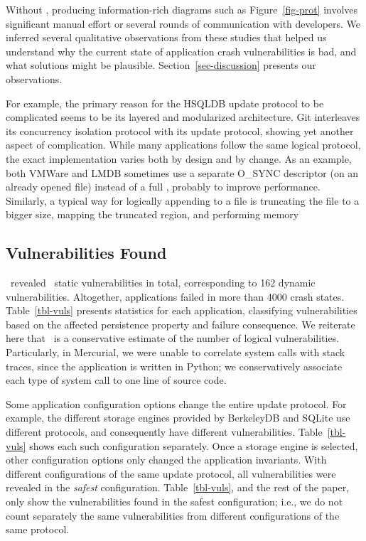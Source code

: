 Without \toolname, producing information-rich diagrams such as Figure~\ref{fig-prot}
involves significant manual effort or several rounds of communication with developers.
We inferred several qualitative observations from these studies that helped us 
understand why the current state of application crash vulnerabilities is bad, and
what solutions might be plausible. Section~\ref{sec-discussion} presents our observations.

For example, the primary reason for the HSQLDB
update protocol to be complicated seems to be its layered and modularized architecture.
Git interleaves its concurrency isolation protocol with its update protocol, showing
yet another aspect of complication. While many applications follow the same logical
protocol, the exact implementation varies both by design and by change. As an example,
both VMWare and LMDB sometimes use a separate O\_SYNC descriptor (on an already opened file)
instead of a full \fsyncSC, probably to improve performance. Similarly, a typical way
for logically appending to a file is truncating the file to a bigger size, mapping the truncated
region, and performing memory 
\fi

\subsection{Vulnerabilities Found}
\label{sec-vuls}


\toolname\ revealed \totbugs\ static vulnerabilities in total, corresponding to 162
dynamic vulnerabilities. Altogether, applications failed in more than 4000
crash states. Table~\ref{tbl-vuls} presents statistics for each application,
classifying vulnerabilities based on the affected persistence property and
failure consequence. We reiterate here that \totbugs\ is a conservative
estimate of the number of logical vulnerabilities. Particularly, in
Mercurial, we were unable to correlate system calls with stack traces, since
the application is written in Python; we conservatively associate each type of
system call to one line of source code.

Some application configuration options change the entire update protocol. For
example, the different storage engines provided by BerkeleyDB and SQLite use
different protocols, and consequently have different vulnerabilities.
Table~\ref{tbl-vuls} shows each such configuration separately. Once a storage
engine is selected, other configuration options only changed the application
invariants. With different configurations of the same update protocol, all
vulnerabilities were revealed in the \textit{safest} configuration.
Table~\ref{tbl-vuls}, and the rest of the paper, only show the vulnerabilities
found in the safest configuration; i.e., we do not count separately the same
vulnerabilities from different configurations of the same protocol.

